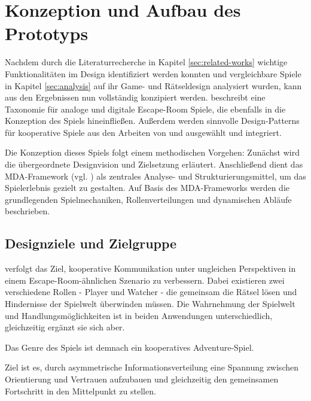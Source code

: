 \chapter{Konzeption und Aufbau des Prototyps}

Nachdem durch die Literaturrecherche in Kapitel \ref{sec:related-works} wichtige Funktionalitäten im Design identifiziert werden konnten und vergleichbare Spiele in Kapitel \ref{sec:analysis} auf ihr Game- und Rätseldesign analysiert wurden, kann aus den Ergebnissen  nun vollständig konzipiert werden. \cite{krekhov_puzzles_2021} beschreibt eine Taxonomie für analoge und digitale Escape-Room Spiele, die ebenfalls in die Konzeption des Spiels hineinfließen. Außerdem werden sinnvolle Design-Patterns für kooperative Spiele aus den Arbeiten von \cite{guimaraes_rocha_game_2008} und \cite{seif_el-nasr_understanding_2010} ausgewählt und integriert.

Die Konzeption dieses Spiels folgt einem methodischen Vorgehen: Zunächst wird die übergeordnete Designvision und Zielsetzung erläutert. Anschließend dient das \ac{MDA}-Framework (vgl. \cite{hunicke_mda_2004}) als zentrales Analyse- und Strukturierungsmittel, um das Spielerlebnis gezielt zu gestalten. Auf Basis des \ac{MDA}-Frameworks werden die grundlegenden Spielmechaniken, Rollenverteilungen und dynamischen Abläufe beschrieben.

\section{Designziele und Zielgruppe}
 verfolgt das Ziel, kooperative Kommunikation unter ungleichen Perspektiven in einem Escape-Room-ähnlichen Szenario zu verbessern. Dabei existieren zwei verschiedene Rollen - Player und Watcher - die gemeinsam die Rätsel lösen und Hindernisse der Spielwelt überwinden müssen. Die Wahrnehmung der Spielwelt und Handlungsmöglichkeiten ist in beiden Anwendungen unterschiedlich, gleichzeitig ergänzt sie sich aber. 

Das Genre des Spiels ist demnach ein kooperatives Adventure-Spiel.

Ziel ist es, durch asymmetrische Informationsverteilung eine Spannung zwischen Orientierung und Vertrauen aufzubauen und gleichzeitig den gemeinsamen Fortschritt in den Mittelpunkt zu stellen.


